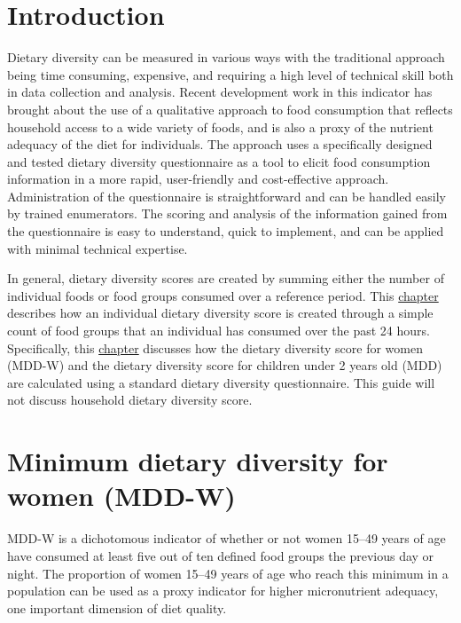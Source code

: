 \documentclass[12pt,]{book}
\theoremstyle{definition}
\theoremstyle{definition}
\theoremstyle{definition}
\theoremstyle{remark}
\begin{document}
\hypertarget{introduction-1}{%
\section{Introduction}\label{introduction-1}}

Dietary diversity can be measured in various ways with the traditional
approach being time consuming, expensive, and requiring a high level of
technical skill both in data collection and analysis. Recent development
work in this indicator has brought about the use of a qualitative
approach to food consumption that reflects household access to a wide
variety of foods, and is also a proxy of the nutrient adequacy of the
diet for individuals. The approach uses a specifically designed and
tested dietary diversity questionnaire as a tool to elicit food
consumption information in a more rapid, user-friendly and
cost-effective approach. Administration of the questionnaire is
straightforward and can be handled easily by trained enumerators. The
scoring and analysis of the information gained from the questionnaire is
easy to understand, quick to implement, and can be applied with minimal
technical expertise.

In general, dietary diversity scores are created by summing either the
number of individual foods or food groups consumed over a reference
period. This \protect\hyperlink{diet}{chapter} describes how an
individual dietary diversity score is created through a simple count of
food groups that an individual has consumed over the past 24 hours.
Specifically, this \protect\hyperlink{diet}{chapter} discusses how the
dietary diversity score for women (MDD-W) and the dietary diversity
score for children under 2 years old (MDD) are calculated using a
standard dietary diversity questionnaire. This guide will not discuss
household dietary diversity score.

\hypertarget{minimum-dietary-diversity-for-women-mdd-w}{%
\section{Minimum dietary diversity for women
(MDD-W)}\label{minimum-dietary-diversity-for-women-mdd-w}}

MDD-W is a dichotomous indicator of whether or not women 15--49 years of
age have consumed at least five out of ten defined food groups the
previous day or night. The proportion of women 15--49 years of age who
reach this minimum in a population can be used as a proxy indicator for
higher micronutrient adequacy, one important dimension of diet quality.
\end{document}
